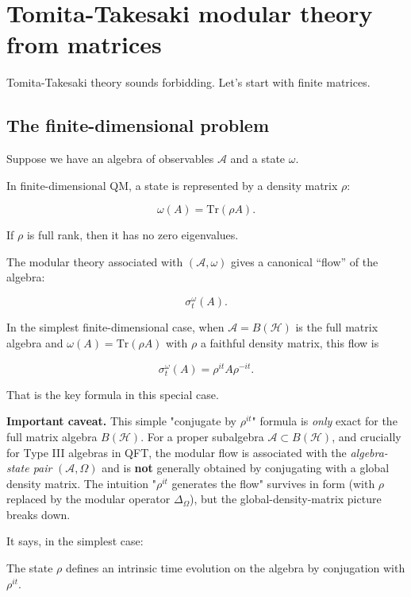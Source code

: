 \documentclass[11pt,a4paper]{article}
\newenvironment{qiqtquote}{\begin{mdframed}[style=quotestyle]}{\end{mdframed}}
\begin{document}
\section{Tomita-Takesaki modular theory from matrices}

Tomita-Takesaki theory sounds forbidding. Let’s start with finite matrices.

\subsection{The finite-dimensional problem}

Suppose we have an algebra of observables $\mathcal{A}$ and a state $\omega$.

In finite-dimensional QM, a state is represented by a density matrix $\rho$:

\[
\omega(A)=\mathrm{Tr}(\rho A).
\]

If $\rho$ is full rank, then it has no zero eigenvalues.

The modular theory associated with $(\mathcal{A},\omega)$ gives a canonical “flow” of the algebra:

\[
\sigma_t^\omega(A).
\]

In the simplest finite-dimensional case, when $\mathcal{A} = B(\mathcal{H})$ is the full matrix algebra and $\omega(A) = \mathrm{Tr}(\rho A)$ with $\rho$ a faithful density matrix, this flow is

\[
\sigma_t^\omega(A)
=
\rho^{it} A \rho^{-it}.
\]

That is the key formula in this special case.

\textbf{Important caveat.} This simple "conjugate by $\rho^{it}$" formula is \emph{only} exact for the full matrix algebra $B(\mathcal{H})$. For a proper subalgebra $\mathcal{A} \subset B(\mathcal{H})$, and crucially for Type III algebras in QFT, the modular flow is associated with the \emph{algebra-state pair} $(\mathcal{A}, \Omega)$ and is \textbf{not} generally obtained by conjugating with a global density matrix. The intuition "$\rho^{it}$ generates the flow" survives in form (with $\rho$ replaced by the modular operator $\Delta_\Omega$), but the global-density-matrix picture breaks down.

It says, in the simplest case:

\begin{qiqtquote}
The state $\rho$ defines an intrinsic time evolution on the algebra by conjugation with $\rho^{it}$.
\end{qiqtquote}
\end{document}
